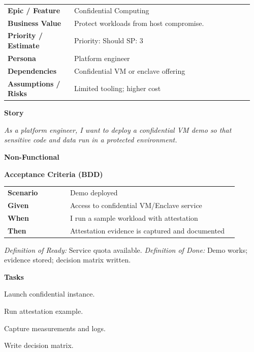 \documentclass[11pt,letterpaper]{article}
\makeatletter
\newenvironment{kvtable}{%
  \par\noindent\begin{tabular}{@{}>{\raggedright\bfseries\arraybackslash}p{0.26\linewidth} >{\raggedright\arraybackslash}p{0.70\linewidth}@{}}
}{\end{tabular}\par}
\newenvironment{bdd}{%
  \par\noindent\begin{tabular}{@{}>{\raggedright\bfseries\arraybackslash}p{0.26\linewidth} >{\raggedright\arraybackslash}p{0.70\linewidth}@{}}
}{\end{tabular}\par}
\newcommand{\DoRDoD}[2]{%
  \vspace{0.35em}
  {\footnotesize\color{Muted}%
    \textit{Definition of Ready:} #1 \; \textbullet\;
    \textit{Definition of Done:} #2%
  }%
}
\newenvironment{storycard}[2]{%
  \begin{tcolorbox}[cloudcard, title={#1 --- #2}]%
}{\end{tcolorbox}}
\newcommand{\sectionlabel}[1]{\par\vspace{0.35em}\textbf{#1}\par}
\makeatother
\begin{document}
\begin{storycard}{CCS-22}{Ch. 22 — Secure Computation Outsourcing}
\begin{kvtable}
Epic / Feature & Confidential Computing\\
Business Value & Protect workloads from host compromise.\\
Priority / Estimate & Priority: Should \quad SP: 3\\
Persona & Platform engineer\\
Dependencies & Confidential VM or enclave offering\\
Assumptions / Risks & Limited tooling; higher cost\\
\end{kvtable}
\sectionlabel{Story}
\textit{As a platform engineer, I want to deploy a confidential VM demo so that sensitive code and data run in a protected environment.}
\sectionlabel{Non-Functional}\;
\sectionlabel{Acceptance Criteria (BDD)}
\begin{bdd}
Scenario & Demo deployed\\
Given & Access to confidential VM/Enclave service\\
When & I run a sample workload with attestation\\
Then & Attestation evidence is captured and documented\\
\end{bdd}
\DoRDoD{Service quota available.}{Demo works; evidence stored; decision matrix written.}
\sectionlabel{Tasks}
\begin{checklist}
\item Launch confidential instance.
\item Run attestation example.
\item Capture measurements and logs.
\item Write decision matrix.
\end{checklist}
\end{storycard}
\end{document}
